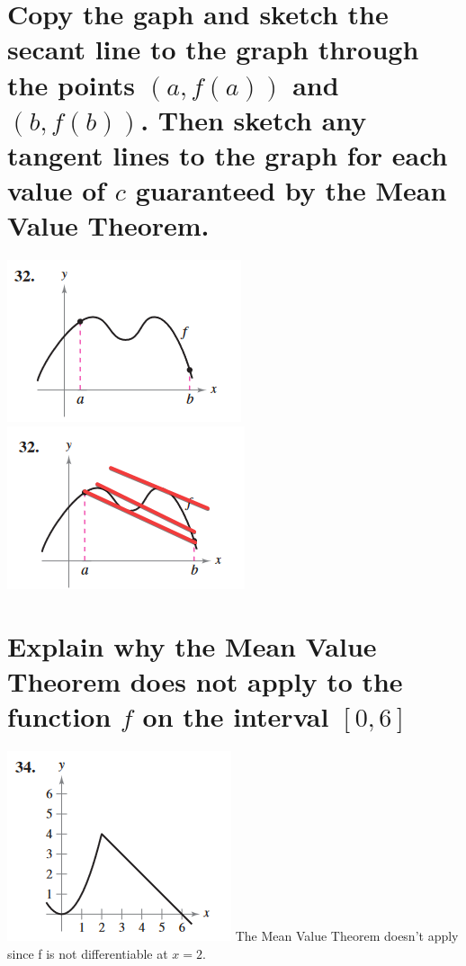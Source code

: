 \documentclass[11pt]{article}
\begin{document}
\section{Copy the gaph and sketch the secant line to the graph through the points $(a, f(a))$ and $(b, f(b))$. Then sketch any  tangent lines to the graph for each value of $c$ guaranteed by the Mean Value Theorem.}
\includegraphics[scale=1]{32a.png}
\includegraphics[scale=1]{32b.png}

\section{Explain why the Mean Value Theorem does not apply to the function $f$ on the interval $[0, 6]$}
\includegraphics{34.png}
The Mean Value Theorem doesn't apply since f is not differentiable at $x=2$.
\end{document}
